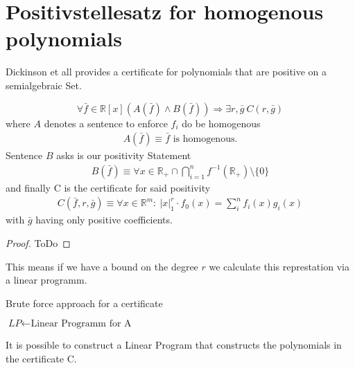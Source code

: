 \documentclass[./main.tex]{subfiles}
\begin{document}
\section{Positivstellesatz for homogenous polynomials}

Dickinson et all provides a certificate for polynomials that are positive on a semialgebraic Set.
\begin{thm}
\begin{equation}
\forall \bar{f} \in \mathbb{R}[x] \left( A(\bar{f}) \wedge B(\bar{f}) \right) \Rightarrow \exists r, \bar{g} \  C(r,\bar{g})
\end{equation}
where $A$ denotes a sentence to enforce $f_i$ do be homogenous
\begin{align*}
A(\bar{f}) \equiv \bar f \text{ is homogenous}.
\end{align*}
Sentence $B$ asks is our positivity Statement
\begin{align*}
B(\bar f ) \equiv \forall x \in \mathbb{R}_+\cap \bigcap_{i=1}^n f^{-1}(\mathbb R_+) \setminus \lbrace 0 \rbrace
\end{align*}
and finally C is the certificate for said positivity
\begin{align*}
C(\bar f ,r, \bar g) \equiv \forall x \in \mathbb{R}^m : \ \vert x \vert_1^r \cdot f_0(x) = \sum_i^n f_i(x)g_i(x) 
\end{align*}
with $\bar g$ having only positive coefficients.
\begin{proof}
ToDo
\end{proof}
\end{thm}
This means if we have a bound on the degree $r$ we calculate this represtation via a linear programm.

\begin{algorithm}
\caption{Brute force approach for a certificate}\label{euclid}
\begin{algorithmic}[1]
\State $\textit{LP} \gets \text{Linear Programm for A}$\\
 {
}
\end{algorithmic}
\end{algorithm}


It is possible to construct a Linear Program that constructs the polynomials in the certificate C.
\end{document}
